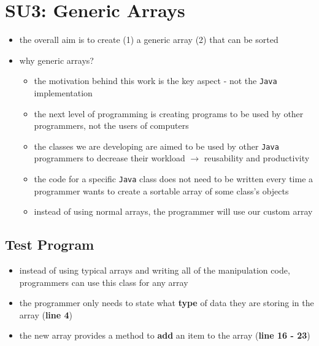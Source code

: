 
\renewcommand{\arraystretch}{1.75} %
\setlength{\tabcolsep}{8pt} %
\setlength{\arrayrulewidth}{0.75pt}

\section{SU3: Generic Arrays}

\begin{itemize}
    \item the overall aim is to create (1) a generic array (2) that can be sorted
    \item why generic arrays?
        \begin{itemize}
            \item the motivation behind this work is the key aspect - not the \texttt{Java} implementation
            \item the next level of programming is creating programs to be used by other programmers, not the users of computers
            \item the classes we are developing are aimed to be used by other \texttt{Java} programmers to decrease their workload $\rightarrow$ reusability and productivity
            \item the code for a specific \texttt{Java} class does not need to be written every time a programmer wants to create a sortable array of some class's objects
            \item instead of using normal arrays, the programmer will use our custom array 
        \end{itemize}
\end{itemize}

\subsection{Test Program}


\begin{itemize}
    \item instead of using typical arrays and writing all of the manipulation code, programmers can use this class for any array 
    \item the programmer only needs to state what \textbf{type} of data they are storing in the array (\textcolor{RedOrange}{\textbf{line 4}})
    \item the new array provides a method to \textbf{add} an item to the array (\textcolor{RedOrange}{\textbf{line 16 - 23}})
\end{itemize}

